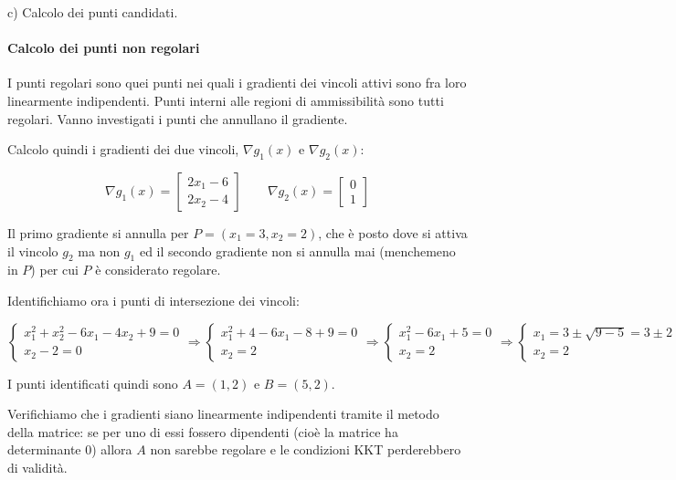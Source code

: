 \documentclass[\main/main.tex]{subfiles}
\begin{document}
c) Calcolo dei punti candidati.

\paragraph*{Calcolo dei punti non regolari}
I punti regolari sono quei punti nei quali i gradienti dei vincoli attivi sono fra loro linearmente indipendenti. Punti interni alle regioni di ammissibilità sono tutti regolari. Vanno investigati i punti che annullano il gradiente.

Calcolo quindi i gradienti dei due vincoli, $\nabla g_1(x)$ e $\nabla g_2(x)$:

\[
	\nabla g_1(x) = \begin{bmatrix}
		2x_1 -6 \\
		2x_2 -4
	\end{bmatrix}
	\qquad
	\nabla g_2(x) = \begin{bmatrix}
		0 \\
		1
	\end{bmatrix}
\]

Il primo gradiente si annulla per $P = (x_1 = 3, x_2 = 2)$, che è posto dove si attiva il vincolo $g_2$ ma non $g_1$ ed il secondo gradiente non si annulla mai (menchemeno in $P$) per cui $P$ è considerato regolare.

Identifichiamo ora i punti di intersezione dei vincoli:

\[
	\begin{cases}
		x^2_1+x^2_2-6x_1-4x_2+9  =  0 \\
		x_2-2 = 0
	\end{cases}
	\Rightarrow
	\begin{cases}
		x^2_1+4-6x_1-8+9  =  0 \\
		x_2 = 2
	\end{cases}
	\Rightarrow
	\begin{cases}
		x^2_1-6x_1+5  =  0 \\
		x_2 = 2
	\end{cases}
	\Rightarrow
	\begin{cases}
		x_1 = 3 \pm \sqrt{9 - 5} = 3 \pm 2 \\
		x_2 = 2
	\end{cases}
\]

I punti identificati quindi sono $A = (1, 2)$ e $B = (5, 2)$.

Verifichiamo che i gradienti siano linearmente indipendenti tramite il metodo della matrice: se per uno di essi fossero dipendenti (cioè la matrice ha determinante 0) allora $A$ non sarebbe regolare e le condizioni KKT perderebbero di validità.
\end{document}
